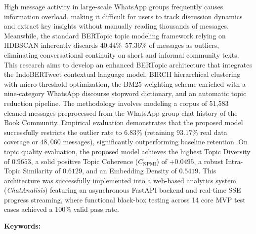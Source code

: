 

\noindent High message activity in large-scale WhatsApp groups frequently causes information overload, making it difficult for users to track discussion dynamics and extract key insights without manually reading thousands of messages. Meanwhile, the standard BERTopic topic modeling framework relying on HDBSCAN inherently discards $40.44\%$--$57.36\%$ of messages as outliers, eliminating conversational continuity on short and informal community texts. This research aims to develop an enhanced BERTopic architecture that integrates the IndoBERTweet contextual language model, BIRCH hierarchical clustering with micro-threshold optimization, the BM25 weighting scheme enriched with a nine-category WhatsApp discourse stopword dictionary, and an automatic topic reduction pipeline. The methodology involves modeling a corpus of 51,583 cleaned messages preprocessed from the WhatsApp group chat history of the Book Community. Empirical evaluation demonstrates that the proposed model successfully restricts the outlier rate to $6.83\%$ (retaining $93.17\%$ real data coverage or $48,060$ messages), significantly outperforming baseline retention. On topic quality evaluation, the proposed model achieves the highest Topic Diversity of $0.9653$, a solid positive Topic Coherence ($C_{\text{NPMI}}$) of $+0.0495$, a robust Intra-Topic Similarity of $0.6129$, and an Embedding Density of $0.5419$. This architecture was successfully implemented into a web-based analytics system (\textit{ChatAnalisis}) featuring an asynchronous FastAPI backend and real-time SSE progress streaming, where functional black-box testing across 14 core MVP test cases achieved a $100\%$ valid pass rate.

\vspace{0.3cm}

\noindent \textbf{Keywords:} \textit{\keywordsListEn}

\newpage


